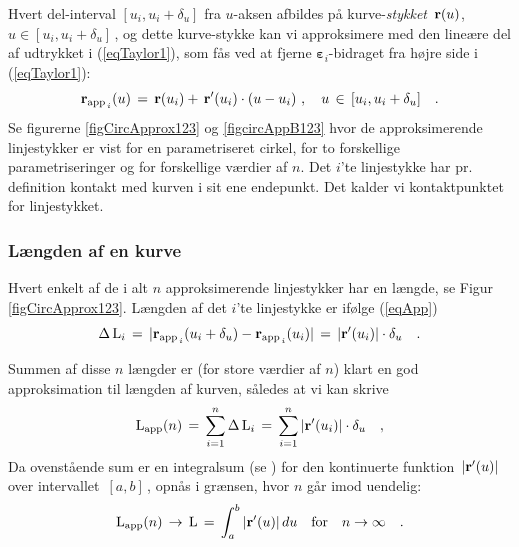Hvert del-interval $[u_{i}, u_{i}+\delta_{u}]$ fra $u$-aksen  afbildes på
kurve-{\em stykket} $\, {\bf r}(u)$, $u \in[u_{i},
u_{i}+\delta_{u}]\, $, og dette kurve-stykke kan vi approksimere med
den lineære del af udtrykket i (\ref{eqTaylor1}), som fås ved at
fjerne ${\bm{\varepsilon}}_{i}$-bidraget fra højre side i
(\ref{eqTaylor1}):
\begin{equation}\label{eqApp}
{\bf r}_{\operatorname{app}_{\,i}}(u)\, = \, {\bf r}(u_{i}) + \, {\bf
r}'(u_{i})\cdot(u-u_{i})\,\, , \quad u \, \in \, [u_{i},
u_{i}+\delta_{u}]\quad .
\end{equation}
Se figurerne \ref{figCircApprox123} og \ref{figcircAppB123} hvor de
approksimerende linjestykker er vist for en parametriseret cirkel,
for to forskellige parametriseringer og for forskellige værdier af
$n$. Det $i$'te linjestykke har pr. definition kontakt med kurven i
sit ene endepunkt. Det kalder vi kontaktpunktet for linjestykket.


\subsubsection{Længden af en kurve}\label{subsecLengthCurve}
Hvert enkelt af de i alt $n$ approksimerende
linjestykker har en længde, se Figur
\ref{figCircApprox123}. Længden af det $i$'te
linjestykke er ifølge (\ref{eqApp})
\begin{equation}
\Delta \operatorname{L}_{i} \, = \,  | {\bf r}_{\operatorname{app}_{\,i}}(u_{i}+\delta_{u})
- {\bf r}_{\operatorname{app}_{\,i}}(u_{i}) |  \, = \,  | {\bf r}'(u_{i})
| \cdot\delta_{u} \quad .
\end{equation}

Summen af disse $n$ længder er (for store værdier af $n$) klart en god approksimation til
længden af kurven, således at vi kan skrive
\begin{equation}
\operatorname{L}_{\operatorname{app}}(n)\, = \,   \sum_{i=1}^{n} \Delta \operatorname{L}_{i} \, = \,
\sum_{i=1}^{n} | {\bf r}'(u_{i}) | \cdot\delta_{u} \quad,
\end{equation}
Da ovenstående sum er en  integralsum (se )
for den kontinuerte funktion $\, | {\bf r}'(u) | \, $ over
intervallet $\, [a, b]\, $, opnås i grænsen, hvor $n$ går imod
uendelig:
\begin{equation}
\operatorname{L}_{\operatorname{app}}(n)\,  \to \, \operatorname{L}\, = \, \int_{a}^{b} | {\bf r}'(u) | \,du
\quad \text{for} \quad n \to \infty \quad.
\end{equation}

